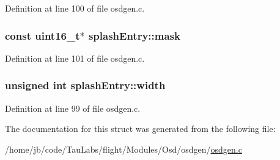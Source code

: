 \-Definition at line 100 of file osdgen.\-c.

\hypertarget{structsplash_entry_a0c3001285740dd3a0351be5565bf13d2}{
\subsubsection[{mask}]{\setlength{\rightskip}{0pt plus 5cm}const uint16\-\_\-t$\ast$ {\bf splash\-Entry\-::mask}}}\label{structsplash_entry_a0c3001285740dd3a0351be5565bf13d2}


\-Definition at line 101 of file osdgen.\-c.

\hypertarget{structsplash_entry_abc2b28627fe7b0fc9344188df68bb455}{
\subsubsection[{width}]{\setlength{\rightskip}{0pt plus 5cm}unsigned int {\bf splash\-Entry\-::width}}}\label{structsplash_entry_abc2b28627fe7b0fc9344188df68bb455}


\-Definition at line 99 of file osdgen.\-c.



\-The documentation for this struct was generated from the following file\-:\begin{DoxyCompactItemize}
\item 
/home/jb/code/\-Tau\-Labs/flight/\-Modules/\-Osd/osdgen/\hyperlink{osdgen_8c}{osdgen.\-c}\end{DoxyCompactItemize}
